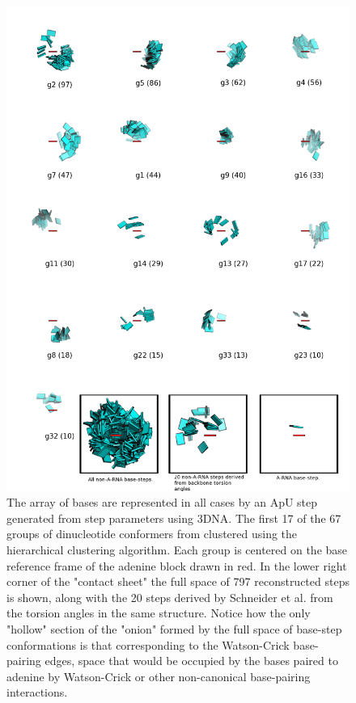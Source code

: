 \begin{figure}
\centering
\includegraphics[angle=0, scale=0.30]{Chapter2/k67_17.png}
\caption{The array  of bases  are represented in  all cases by  an ApU
  step generated from step parameters  using 3DNA. The first 17 of the
  67  groups  of  dinucleotide  conformers from  clustered  using  the
  hierarchical clustering  algorithm.  Each  group is centered  on the
  base  reference frame of  the adenine  block drawn  in red.   In the
  lower  right corner of  the "contact  sheet" the  full space  of 797
  reconstructed steps  is shown,  along with the  20 steps  derived by
  Schneider et  al.  \cite{schneider2004}  from the torsion  angles in
  the same  structure.  Notice  how the only  "hollow" section  of the
  "onion" formed by the full  space of base-step conformations is that
  corresponding  to the  Watson-Crick base-pairing  edges,  space that
  would be occupied by the  bases paired to adenine by Watson-Crick or
  other non-canonical base-pairing interactions.}
\label{fig:noarnak67}
\end{figure}

